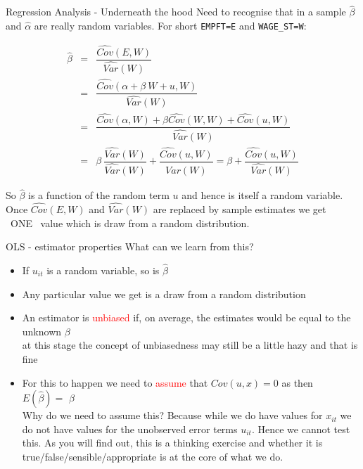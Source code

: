 \documentclass[
  ignorenonframetext,
]{beamer}
\begin{document}
\begin{frame}{Regression Analysis - Underneath the hood}
\label{regression-analysis---underneath-the-hood}
Need to recognise that in a sample \(\hat{\beta}\) and \(\hat{\alpha}\)
are really \textcolor{student}{random variables}. For short
\texttt{EMPFT=E} and \texttt{WAGE\_ST=W}:

\begin{eqnarray*}
\hat{\beta} &=& \dfrac{\widehat{Cov}(E,W)}{\widehat{Var}(W)}\\
          &=&\dfrac{\widehat{Cov}(\alpha + \beta~ W + u,W)}{\widehat{Var}(W)}\\
          &=&\dfrac{\widehat{Cov}(\alpha,W) + \beta \widehat{Cov}(W,W) + \widehat{Cov}(u,W)}{\widehat{Var}(W)}\\
          &=& \beta ~\dfrac{\widehat{Var}(W)}{\widehat{Var}(W)}  + \dfrac{\widehat{Cov}(u,W)}{\widehat{Var}(W)}= \beta  + \dfrac{\widehat{Cov}(u,W)}{\widehat{Var}(W)}
\end{eqnarray*}

So \(\hat{\beta}\) is a function of the random term \(u\) and hence is
itself a random variable. Once \(\widehat{Cov}(E,W)\) and
\(\widehat{Var}(W)\) are replaced by sample estimates we get
\textcolor{student}{~ONE~} value which is draw from a
\textcolor{student}{random distribution.}
\end{frame}

\begin{frame}{OLS - estimator properties}
\label{ols---estimator-properties}
What can we learn from this?

\begin{itemize}
  \item If $u_{it}$ is a random variable, so is \textcolor{student}{ $\widehat{\beta}$}
  \item Any particular value we get is a \textcolor{student}{draw from a random distribution}
  \item An estimator is \textcolor{red}{unbiased} if, on average, the estimates would be equal to the unknown $\beta$\\
  \textcolor{student}{at this stage the concept of unbiasedness may still be a little hazy and that is fine}
  \item For this to happen we need to \textcolor{red}{assume} that $Cov(u,x)=0$ as then \\
        $E(\widehat{\beta})=$ \textcolor{student}{$\beta$}\\
        \textcolor{student}{Why do we need to assume this? Because while we do have values for $x_{it}$ we do not have values for the unobserved error terms $u_{it}$. Hence we cannot test this. As you will find out, this is a thinking exercise and whether it is true/false/sensible/appropriate is at the core of what we do.}
\end{itemize}
\end{frame}
\end{document}
